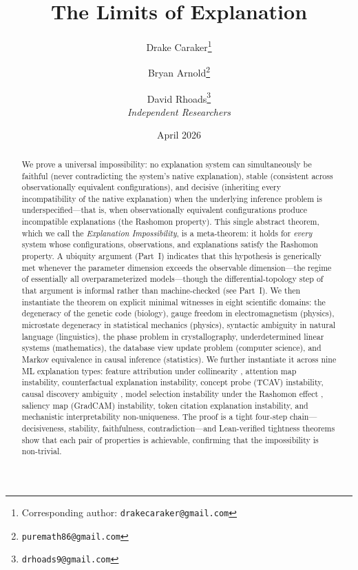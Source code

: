 \documentclass[11pt,a4paper]{article}
\title{The Limits of Explanation}
\author{%
  Drake Caraker\thanks{Corresponding author: \texttt{drakecaraker@gmail.com}}
  \and
  Bryan Arnold\thanks{\texttt{puremath86@gmail.com}}
  \and
  David Rhoads\thanks{\texttt{drhoads9@gmail.com}}
  \\[8pt]
  \textit{Independent Researchers}
}
\date{April 2026}
\begin{document}
\maketitle
\thispagestyle{empty}

\begin{abstract}
We prove a universal impossibility: no explanation system can simultaneously be
faithful (never contradicting the system's native explanation), stable
(consistent across observationally equivalent configurations), and decisive
(inheriting every incompatibility of the native explanation) when
the underlying inference problem is underspecified---that is, when
observationally equivalent configurations produce incompatible explanations
(the Rashomon property).
This single abstract theorem, which we call the \emph{Explanation
Impossibility}, is a meta-theorem: it holds for \emph{every} system whose
configurations, observations, and explanations satisfy the Rashomon property.
A ubiquity argument (Part~I) indicates that this hypothesis is generically met
whenever the parameter dimension exceeds the observable dimension---the regime
of essentially all overparameterized models---though the differential-topology
step of that argument is informal rather than machine-checked (see Part~I).
We then instantiate the theorem on explicit minimal witnesses in
eight scientific domains: the degeneracy of the genetic code (biology),
gauge freedom in electromagnetism (physics), microstate degeneracy in
statistical mechanics (physics), syntactic ambiguity in natural
language (linguistics), the phase problem in crystallography,
underdetermined linear systems (mathematics), the database view update
problem (computer science), and Markov equivalence in causal inference
(statistics).  We further instantiate it across nine ML explanation types:
feature attribution under collinearity
\citep{bilodeau2024impossibility}, attention map instability, counterfactual
explanation instability, concept probe (TCAV) instability, causal discovery
ambiguity \citep{verma1991equivalence}, model selection instability under the
Rashomon effect \citep{rudin2024amazing,fisher2019models}, saliency map
(GradCAM) instability, token citation explanation instability, and
mechanistic interpretability non-uniqueness.
The proof is a tight four-step chain---decisiveness, stability, faithfulness,
contradiction---and Lean-verified tightness theorems show that each pair of
properties is achievable, confirming that the impossibility is non-trivial.

\end{abstract}
\end{document}
